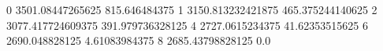 0 3501.08447265625 815.646484375
1 3150.813232421875 465.375244140625
2 3077.417724609375 391.979736328125
4 2727.0615234375 41.62353515625
6 2690.048828125 4.61083984375
8 2685.43798828125 0.0
